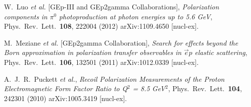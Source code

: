 \documentclass[11pt]{article}
\begin{document}
\begin{thebibliography}{99}
         W.~Luo {\it et al.} [GEp-III and GEp2gamma Collaborations],
         \emph{Polarization components in $\pi^{0}$ photoproduction at photon energies up to 5.6 GeV},
         Phys.\ Rev.\ Lett.\  {\bf 108}, 222004 (2012)
         arXiv:1109.4650 [nucl-ex].

         M.~Meziane {\it et al.} [GEp2gamma Collaboration],
         \emph{Search for effects beyond the Born approximation in polarization transfer observables in $\vec{e}p$ elastic scattering},
         Phys.\ Rev.\ Lett.\  {\bf 106}, 132501 (2011)
         arXiv:1012.0339 [nucl-ex].

         A.~J.~R.~Puckett {\it et al.},
         \emph{Recoil Polarization Measurements of the Proton Electromagnetic Form Factor Ratio to Q$^2$ = 8.5 GeV$^2$},
         Phys.\ Rev.\ Lett.\  {\bf 104}, 242301 (2010)
         arXiv:1005.3419 [nucl-ex].

    \end{thebibliography}
    \nocite{*}
\end{document}
